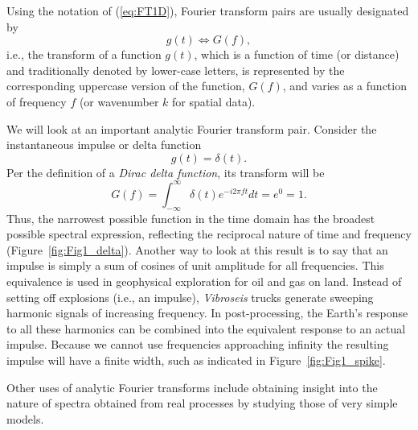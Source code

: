 	Using the notation of (\ref{eq:FT1D}), Fourier transform pairs are usually designated by
$$
g(t) \Leftrightarrow G(f),
$$
i.e., the transform of a function $g(t)$, which is a function of time (or distance) and traditionally denoted by lower-case letters,
is represented by the corresponding uppercase version of
the function, $G(f)$, and varies as a function of frequency $f$ (or wavenumber $k$ for spatial data).
\begin{example}
We will look at an important analytic Fourier transform pair.  Consider the instantaneous impulse or delta function
$$
g(t)= \delta (t).
$$
Per the definition of a \emph{Dirac delta function}, its transform will be
\begin{equation}
G(f)= \int_{-\infty}^\infty \delta (t) e^{-i 2 \pi f t} dt= e^{0} = 1.
\label{eq:spike}
\end{equation}
Thus, the narrowest possible function in the time domain has the broadest possible spectral expression, reflecting
the reciprocal nature of time and frequency (Figure~\ref{fig:Fig1_delta}).  Another way to look at this result is to say that an impulse is simply
a sum of cosines of unit amplitude for all frequencies.  This equivalence is used in geophysical exploration for oil and gas on
land. Instead of setting off explosions (i.e., an impulse), \emph{Vibroseis} trucks generate sweeping harmonic signals of increasing frequency.
In post-processing, the Earth's response to all these harmonics can be combined into the equivalent response to an actual impulse.  Because we cannot
use frequencies approaching infinity the resulting impulse will have a finite width, such as indicated in Figure~\ref{fig:Fig1_spike}.
\end{example}
Other uses of analytic Fourier transforms include obtaining insight into the nature of spectra obtained from real processes
by studying those of very simple models.

